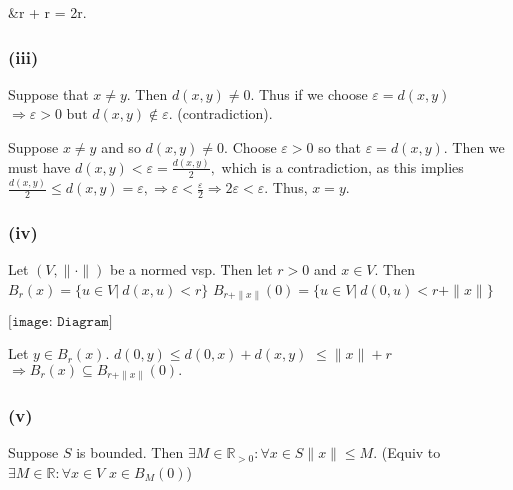 \documentclass{article}
\theoremstyle{definition}
\numberwithin{equation}{section}
\begin{document}
&\leq r + r = 2r.
\

\subsubsection*{(iii)}
Suppose that \( x \ne y \). Then \( d(x, y) \ne 0 \). Thus if we choose \( \varepsilon = d(x, y) \) 
$
\Rightarrow \varepsilon > 0 \text{ but } d(x, y) \notin \varepsilon. 
$
(contradiction).

Suppose \( x \ne y \) and so \( d(x, y) \ne 0 \). Choose \( \varepsilon > 0 \) so that \( \varepsilon = d(x, y) \). Then we must have 
$
d(x, y) < \varepsilon = \frac{d(x, y)}{2},
$
which is a contradiction, as this implies
$
\frac{d(x, y)}{2} \le d(x, y) = \varepsilon, \Rightarrow \varepsilon < \frac{\varepsilon}{2} \Rightarrow 2 \varepsilon < \varepsilon.
$
Thus, \( x = y \).

\subsubsection*{(iv)}
Let \( (V, \| \cdot \|) \) be a normed vsp. Then let \( r > 0 \) and \( x \in V \). Then
$
B_r(x) = \{ u \in V | \ d(x, u) < r \}
$
$
B_{r + \| x \| }(0) = \{ u \in V | \ d(0, u) < r + \| x \| \}
$

$
\texttt{[image: Diagram]}
$

Let \( y \in B_r(x) \). 
$
d(0, y) \le d(0, x) + d(x, y)
$
$
\le \| x \| + r
$
$
\Rightarrow B_r(x) \subseteq B_{r + \| x \| } (0).
$

\subsubsection*{(v)}
Suppose \( S \) is bounded. Then 
$
\exists M \in \mathbb{R}_{> 0}: \forall x \in S \| x \| \le M.
$
(Equiv to \( \exists M \in \mathbb{R}: \forall x \in V \) \( x \in B_M(0) \))
\end{document}
